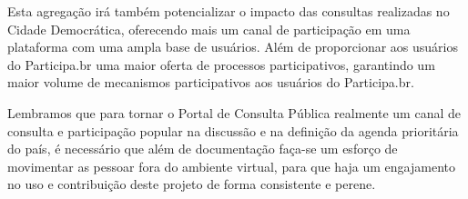 \documentclass[12pt]{article}
\begin{document}
Esta agregação irá também potencializar o impacto das consultas realizadas no
Cidade Democrática, oferecendo mais um canal de participação em uma plataforma
com uma ampla base de usuários. Além de proporcionar aos usuários do
Participa.br uma maior oferta de processos participativos, garantindo um maior
volume de mecanismos participativos aos usuários do Participa.br.

Lembramos que para tornar o Portal de Consulta Pública realmente um canal de
consulta e participação popular na discussão e na definição da agenda
prioritária do país, é necessário que além de documentação faça-se um esforço
de movimentar as pessoar fora do ambiente virtual, para que haja um
engajamento no uso e contribuição deste projeto de forma consistente e perene.

\newpage

\newpage
\listoffigures
\newpage
\printindex
\end{document}
